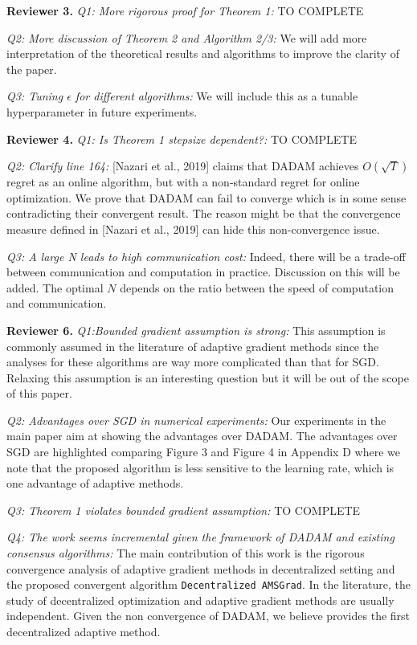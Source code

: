 \documentclass{article}
\begin{document}
\textbf{Reviewer 3.}
\textit{Q1: More rigorous proof for Theorem 1:}
{\color{red} TO COMPLETE}

\textit{Q2: More discussion of Theorem 2 and Algorithm 2/3:}
We will add more interpretation of the theoretical results and algorithms to improve the clarity of the paper.

\textit{Q3: Tuning $\epsilon$ for different algorithms:}
We will include this as a tunable hyperparameter in future experiments. 

\textbf{Reviewer 4.}
\textit{Q1: Is Theorem 1 stepsize dependent?:}
{\color{red} TO COMPLETE}

\textit{Q2:  Clarify line 164:}
 [Nazari et al., 2019] claims that DADAM achieves $O(\sqrt{T})$ regret as an online algorithm, but with a non-standard regret for online optimization. 
 We prove that DADAM can fail to converge which is in some sense contradicting their convergent result. The reason might be that the convergence measure defined in [Nazari et al., 2019] can hide this non-convergence issue.

\textit{Q3: A large N leads to high communication cost:}
Indeed, there will be a trade-off between communication and computation in practice.
Discussion on this will be added.
The optimal $N$ depends on the ratio between the speed of computation and communication.   

\textbf{Reviewer 6.}
\textit{Q1:Bounded gradient assumption is strong:}
This assumption is commonly assumed in the literature of adaptive gradient methods since the analyses for these algorithms are way more complicated than that for SGD. 
Relaxing this assumption is an interesting question but it will be out of the scope of this paper.

\textit{Q2: Advantages over SGD in numerical experiments:}
Our experiments in the main paper aim at showing the advantages over DADAM. 
The advantages over SGD are highlighted comparing Figure 3 and Figure 4 in Appendix D where we note that the proposed algorithm is less sensitive to the learning rate, which is one advantage of adaptive methods.

\textit{Q3: Theorem 1 violates bounded gradient assumption:}
{\color{red} TO COMPLETE}

\textit{Q4: The work seems incremental given the framework of DADAM and existing consensus algorithms:}
The main contribution of this work is the rigorous convergence analysis of adaptive gradient methods in decentralized setting and the proposed convergent algorithm \texttt{Decentralized AMSGrad}. 
In the literature, the study of decentralized optimization and adaptive gradient methods are usually independent. 
Given the non convergence of DADAM, we believe provides the first decentralized adaptive method.
\end{document}
